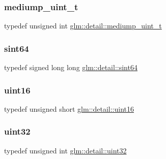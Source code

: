 \mbox{\label{namespaceglm_1_1detail_a98f572e92099cc1b5740f1ccf1c80f8d}} 
\subsubsection{\texorpdfstring{mediump\+\_\+uint\+\_\+t}{mediump\_uint\_t}}
{\footnotesize\ttfamily typedef unsigned int \mbox{\hyperlink{namespaceglm_1_1detail_a98f572e92099cc1b5740f1ccf1c80f8d}{glm\+::detail\+::mediump\+\_\+uint\+\_\+t}}}

\mbox{\label{namespaceglm_1_1detail_aa9fd5478f3e347aa0b2d1a8bf3408544}} 
\subsubsection{\texorpdfstring{sint64}{sint64}}
{\footnotesize\ttfamily typedef signed long long \mbox{\hyperlink{namespaceglm_1_1detail_aa9fd5478f3e347aa0b2d1a8bf3408544}{glm\+::detail\+::sint64}}}

\mbox{\label{namespaceglm_1_1detail_a47b2a7d006d187338e8031a352d1ce56}} 
\subsubsection{\texorpdfstring{uint16}{uint16}}
{\footnotesize\ttfamily typedef unsigned short \mbox{\hyperlink{namespaceglm_1_1detail_a47b2a7d006d187338e8031a352d1ce56}{glm\+::detail\+::uint16}}}

\mbox{\label{namespaceglm_1_1detail_ade6cfbf377022aaa391af8cd50489222}} 
\subsubsection{\texorpdfstring{uint32}{uint32}}
{\footnotesize\ttfamily typedef unsigned int \mbox{\hyperlink{namespaceglm_1_1detail_ade6cfbf377022aaa391af8cd50489222}{glm\+::detail\+::uint32}}}

